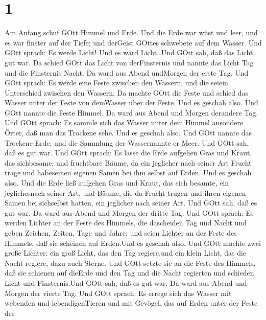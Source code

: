 \hypertarget{section}{%
\section{1}\label{section}}

 Am Anfang schuf GOtt Himmel und Erde.  Und die
Erde war wüst und leer, und es war finster auf der Tiefe; und derGeist
GOttes schwebete auf dem Wasser.  Und GOtt sprach: Es werde
Licht! Und es ward Licht.  Und GOtt sah, daß das Licht gut
war. Da schied GOtt das Licht von derFinsternis  und nannte
das Licht Tag und die Finsternis Nacht. Da ward aus Abend undMorgen der
erste Tag.  Und GOtt sprach: Es werde eine Feste zwischen
den Wassern, und die seiein Unterschied zwischen den Wassern.
 Da machte GOtt die Feste und schied das Wasser unter der
Feste von demWasser über der Feste. Und es geschah also. 
Und GOtt nannte die Feste Himmel. Da ward aus Abend und Morgen derandere
Tag.  Und GOtt sprach: Es sammle sich das Wasser unter dem
Himmel ansondere Örter, daß man das Trockene sehe. Und es geschah also.
 Und GOtt nannte das Trockene Erde, und die Sammlung der
Wassernannte er Meer. Und GOtt sah, daß es gut war.  Und
GOtt sprach: Es lasse die Erde aufgehen Gras und Kraut, das sichbesame,
und fruchtbare Bäume, da ein jeglicher nach seiner Art Frucht trage und
habeseinen eigenen Samen bei ihm selbst auf Erden. Und es geschah also.
 Und die Erde ließ aufgehen Gras und Kraut, das sich
besamte, ein jeglichesnach seiner Art, und Bäume, die da Frucht trugen
und ihren eigenen Samen bei sichselbst hatten, ein jeglicher nach seiner
Art. Und GOtt sah, daß es gut war.  Da ward aus Abend und
Morgen der dritte Tag.  Und GOtt sprach: Es werden Lichter
an der Feste des Himmels, die dascheiden Tag und Nacht und geben
Zeichen, Zeiten, Tage und Jahre;  und seien Lichter an der
Feste des Himmels, daß sie scheinen auf Erden.Und es geschah also.
 Und GOtt machte zwei große Lichter: ein groß Licht, das
den Tag regiere,und ein klein Licht, das die Nacht regiere, dazu auch
Sterne.  Und GOtt setzte sie an die Feste des Himmels, daß
sie schienen auf dieErde  und den Tag und die Nacht
regierten und schieden Licht und Finsternis.Und GOtt sah, daß es gut
war.  Da ward aus Abend und Morgen der vierte Tag.
 Und GOtt sprach: Es errege sich das Wasser mit webenden
und lebendigenTieren und mit Gevögel, das auf Erden unter der Feste des
